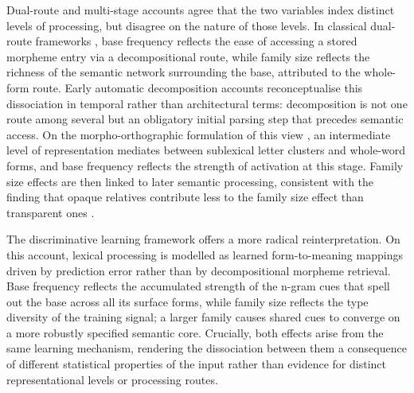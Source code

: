 \documentclass[utf8]{FrontiersinHarvard} %
\begin{document}
	Dual-route and multi-stage accounts agree that the two variables index distinct levels of processing, but disagree on the nature of those levels. In classical dual-route frameworks \citep{schreuderModelingMorphologicalProcessing1995, dejongMorphologicalFamilySize2000}, base frequency reflects the ease of accessing a stored morpheme entry via a decompositional route, while family size reflects the richness of the semantic network surrounding the base, attributed to the whole-form route. Early automatic decomposition accounts \citep{taft_lexical_1975, taftMorphologicalDecompositionReverse2004} reconceptualise this dissociation in temporal rather than architectural terms: decomposition is not one route among several but an obligatory initial parsing step that precedes semantic access. On the morpho-orthographic formulation of this view \citep{rastleMorphologicalDecompositionBased2008, longtinMorphologicalDecompositionEarly2005, morrisSemanticTransparencyMasked2007}, an intermediate level of representation mediates between sublexical letter clusters and whole-word forms, and base frequency reflects the strength of activation at this stage. Family size effects are then linked to later semantic processing, consistent with the finding that opaque relatives contribute less to the family size effect than transparent ones \citep{schreuderHowComplexSimplex1997, dejongMorphologicalFamilySize2000}. 
	
	The discriminative learning framework \citep[NDL/LDL;][]{chuangDiscriminativeLearningLexicon} offers a more radical reinterpretation. On this account, lexical processing is modelled as learned form-to-meaning mappings driven by prediction error rather than by decompositional morpheme retrieval. Base frequency reflects the accumulated strength of the n-gram cues that spell out the base across all its surface forms, while family size reflects the type diversity of the training signal; a larger family causes shared cues to converge on a more robustly specified semantic core. Crucially, both effects arise from the same learning mechanism, rendering the dissociation between them a consequence of different statistical properties of the input rather than evidence for distinct representational levels or processing routes.
	
\end{document}
